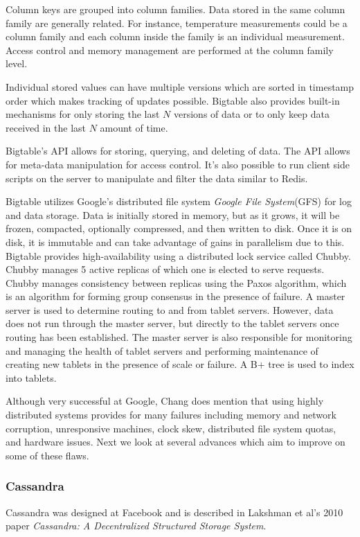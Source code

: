 \documentclass[]{article}
\begin{document}
Column keys are grouped into column families. Data stored in the same column family are generally related. For instance, temperature measurements could be a column family and each column inside the family is an individual measurement. Access control and memory management are performed at the column family level.

Individual stored values can have multiple versions which are sorted in timestamp order which makes tracking of updates possible. Bigtable also provides built-in mechanisms for only storing the last $N$ versions of data or to only keep data received in the last $N$ amount of time.

Bigtable's API allows for storing, querying, and deleting of data. The API allows for meta-data manipulation for access control. It's also possible to run client side scripts on the server to manipulate and filter the data similar to Redis.

Bigtable utilizes Google's distributed file system \textit{Google File System}(GFS) for log and data storage. Data is initially stored in memory, but as it grows, it will be frozen, compacted, optionally compressed, and then written to disk. Once it is on disk, it is immutable and can take advantage of gains in parallelism due to this. Bigtable provides high-availability using a distributed lock service called Chubby\cite{burrows2006chubby}. Chubby manages 5 active replicas of which one is elected to serve requests. Chubby manages consistency between replicas using the Paxos algorithm\cite{chandra2007paxos}, which is an algorithm for forming group consensus in the presence of failure. A master server is used to determine routing to and from tablet servers. However, data does not run through the master server, but directly to the tablet servers once routing has been established.  The master server is also responsible for monitoring and managing the health of tablet servers and performing maintenance of creating new tablets in the presence of scale or failure. A B+ tree is used to index into tablets.

Although very successful at Google, Chang does mention that using highly distributed systems provides for many failures including memory and network corruption, unresponsive machines, clock skew, distributed file system quotas, and hardware issues. Next we look at several advances which aim to improve on some of these flaws.

\subsubsection{Cassandra}\label{sssec:cassandra}
Cassandra was designed at Facebook and is described in Lakshman et al's 2010 paper \textit{Cassandra: A Decentralized Structured Storage System}\cite{lakshman_cassandra:_2010}.
\end{document}

